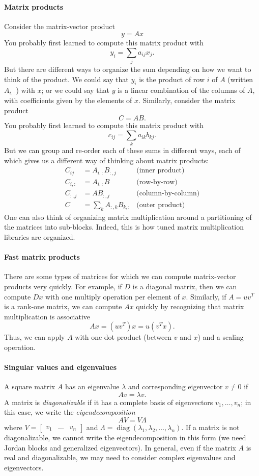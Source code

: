 \documentclass[12pt, leqno]{article}
\begin{document}
\paragraph{Matrix products}
Consider the matrix-vector product
\[
  y = Ax
\]
You probably first learned to compute this matrix product with
\[
  y_{i} = \sum_j a_{ij} x_j.
\]
But there are different ways to organize the sum depending on how
we want to think of the product.  We could say that $y_i$ is the
product of row $i$ of $A$ (written $A_{i,:}$) with $x$; or we could
say that $y$ is a linear combination of the columns of $A$,
with coefficients given by the elements of $x$.  Similarly,
consider the matrix product
\[
  C = A B.
\]
You probably first learned to compute this matrix product with
\[
  c_{ij} = \sum_k a_{ik} b_{kj}.
\]
But we can group and re-order each of these sums in different ways,
each of which gives us a different way of thinking about matrix
products:
\begin{align*}
  C_{ij} &= A_{i,:} B_{:,j} & \mbox{(inner product)} \\
  C_{i,:} &= A_{i,:} B & \mbox{(row-by-row)} \\
  C_{:,j} &= A B_{:,j} & \mbox{(column-by-column)} \\
  C &= \sum_k A_{:,k} B_{k,:} & \mbox{(outer product)}
\end{align*}
One can also think of organizing matrix multiplication around a
partitioning of the matrices into sub-blocks.  Indeed, this is how
tuned matrix multiplication libraries are organized.

\paragraph{Fast matrix products}
There are some types of matrices for which we can compute
matrix-vector products very quickly.  For example, if
$D$ is a diagonal matrix, then we can compute $Dx$ with one
multiply operation per element of $x$.  Similarly, if
$A = uv^T$ is a rank-one matrix, we can compute $Ax$ quickly
by recognizing that matrix multiplication is associative
\[
  Ax = (uv^T) x = u (v^T x).
\]
Thus, we can apply $A$ with one dot product (between $v$ and $x$)
and a scaling operation.

\paragraph{Singular values and eigenvalues}
A square matrix $A$ has an eigenvalue $\lambda$ and corresponding eigenvector
$v \neq 0$ if
\[
  Av = \lambda v.
\]
A matrix is {\em diagonalizable} if it has a complete basis of
eigenvectors $v_1, \ldots, v_n$; in this case, we write the
{\em eigendecomposition}
\[
  AV = V\Lambda
\]
where $V = \begin{bmatrix} v_1 & \ldots & v_n \end{bmatrix}$
and $\Lambda = \operatorname{diag}(\lambda_1, \lambda_2, \ldots, \lambda_n)$.
If a matrix is not diagonalizable, we cannot write the
eigendecomposition in this form (we need Jordan blocks and generalized
eigenvectors).  In general, even if the matrix $A$ is real and
diagonalizable, we may need to consider complex eigenvalues and eigenvectors.
\end{document}
